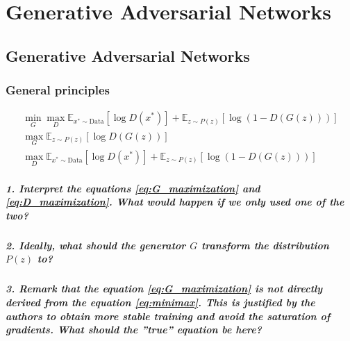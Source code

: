 \chapter{Generative Adversarial Networks}
\graphicspath{{figs/2de/}}


\section{Generative Adversarial Networks}


\subsection{General principles}

\begin{align}
    \min_{G} \max_{D} \mathbb{E}_{x^* \sim \text{Data}} \left[ \log D(x^*) \right] + \mathbb{E}_{z \sim P(z)} \left[ \log (1 - D(G(z))) \right] \label{eq:minimax} \\
    \max_{G} \mathbb{E}_{z \sim P(z)} \left[ \log D(G(z)) \right] \label{eq:G_maximization} \\
    \max_{D} \mathbb{E}_{x^* \sim \text{Data}} \left[ \log D(x^*) \right] + \mathbb{E}_{z \sim P(z)} \left[ \log (1 - D(G(z))) \right] \label{eq:D_maximization}
\end{align}
    
\paragraph*{1. Interpret the equations \ref{eq:G_maximization} and \ref{eq:D_maximization}. What would happen if we only used one of the two?}

\paragraph*{2. Ideally, what should the generator $G$ transform the distribution $P(z)$ to?}

\paragraph*{3. Remark that the equation \ref{eq:G_maximization} is not directly derived from the equation \ref{eq:minimax}. This is justified by the authors to obtain more stable training and avoid the saturation of gradients. What should the ''true'' equation be here?}

